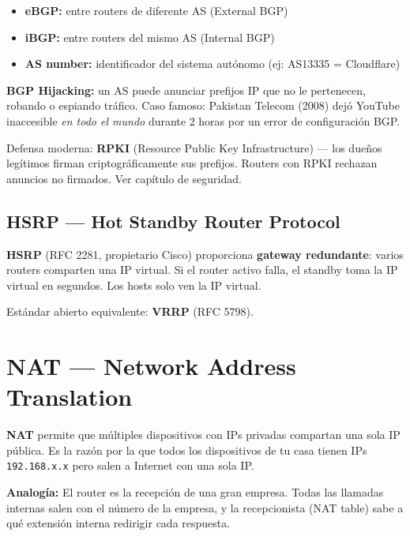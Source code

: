 \begin{itemize}
    \item \textbf{eBGP:} entre routers de diferente AS (External BGP)
    \item \textbf{iBGP:} entre routers del mismo AS (Internal BGP)
    \item \textbf{AS number:} identificador del sistema autónomo (ej: AS13335 = Cloudflare)
\end{itemize}

\begin{cuidado}
\textbf{BGP Hijacking:} un AS puede anunciar prefijos IP que no le pertenecen,
robando o espiando tráfico. Caso famoso: Pakistan Telecom (2008) dejó YouTube
inaccesible \textit{en todo el mundo} durante 2 horas por un error de configuración BGP.

Defensa moderna: \textbf{RPKI} (Resource Public Key Infrastructure) ---
los dueños legítimos firman criptográficamente sus prefijos. Routers con
RPKI rechazan anuncios no firmados. Ver capítulo de seguridad.
\end{cuidado}

\subsection{HSRP --- Hot Standby Router Protocol}

\begin{concepto}
\textbf{HSRP} (RFC 2281, propietario Cisco) proporciona \textbf{gateway redundante}:
varios routers comparten una IP virtual. Si el router activo falla,
el standby toma la IP virtual en segundos. Los hosts solo ven la IP virtual.

Estándar abierto equivalente: \textbf{VRRP} (RFC 5798).
\end{concepto}

\section{ NAT --- Network Address Translation}

\begin{concepto}
\textbf{NAT} permite que múltiples dispositivos con IPs privadas compartan
una sola IP pública. Es la razón por la que todos los dispositivos de tu
casa tienen IPs \texttt{192.168.x.x} pero salen a Internet con una sola IP.

 \textbf{Analogía:} El router es la recepción de una gran
empresa. Todas las llamadas internas salen con el número de la empresa, y la
recepcionista (NAT table) sabe a qué extensión interna redirigir cada respuesta.
\end{concepto}

